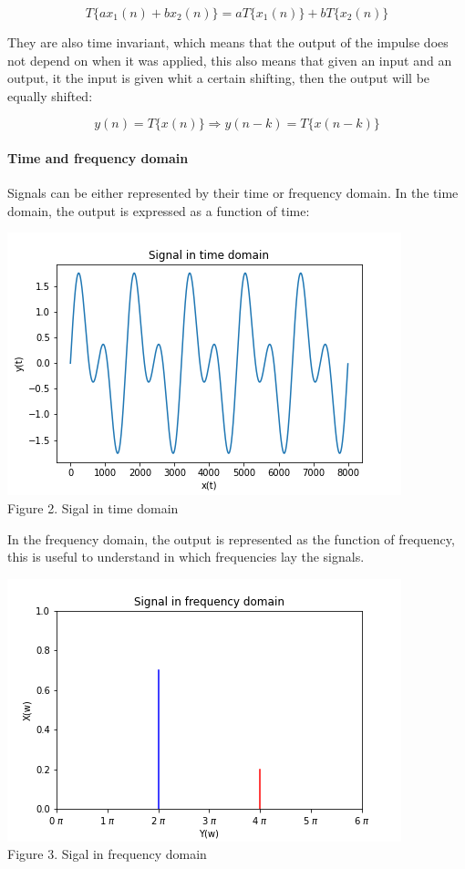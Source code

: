 {{{{{$$T\{ax_1(n) + bx_2(n)\} = aT\{x_1(n)\} + bT\{x_2(n)\}$$

They are also time invariant, which means that the output of the impulse does not depend on when it was applied, this also means  that given an input and an output, it  the input is given whit a certain shifting, then the output will be equally shifted:

$$y(n) = T\{x(n)\} \Rightarrow y(n - k) = T\{x(n - k)\}
$$

\paragraph{Time and frequency domain}
Signals can be either represented by their time or frequency domain. In the time domain, the output is expressed as a function of time:

\begin{center}
\includegraphics[scale = 0.6]
{images/timedomain.png}\\
Figure 2. Sigal in time domain
\end{center}

In the frequency domain, the output is represented as the function of frequency, this is useful to understand in which frequencies lay the signals.

\begin{center}
\includegraphics[scale = 0.6]
{images/frequencydomain.png}\\
Figure 3. Sigal in frequency domain
\end{center}


}}}}}
